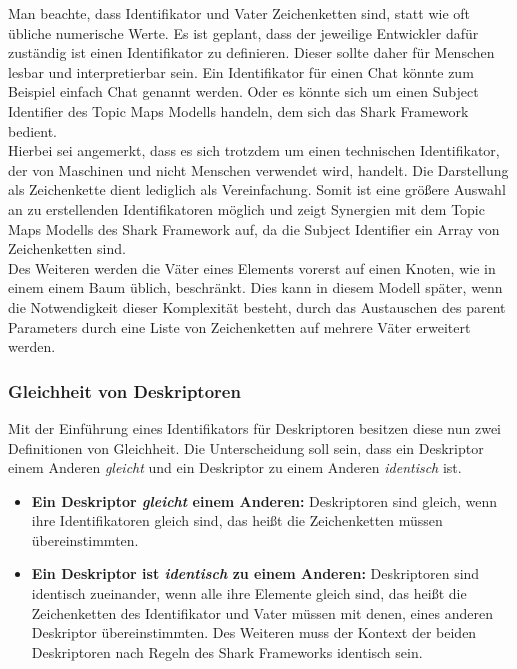 \documentclass[a4paper]{article}
\begin{document}
	Man beachte, dass Identifikator und Vater Zeichenketten sind, statt wie
	oft übliche numerische Werte. Es ist geplant, dass der jeweilige Entwickler
	dafür zuständig ist einen Identifikator zu definieren. Dieser sollte daher
	für Menschen lesbar und interpretierbar sein. Ein Identifikator für einen
	Chat könnte zum Beispiel einfach Chat genannt werden. Oder es könnte sich um
	einen Subject Identifier des Topic Maps Modells handeln, dem sich das Shark
	Framework bedient. \\
	
	Hierbei sei angemerkt, dass es sich trotzdem um einen technischen Identifikator,
	der von Maschinen und nicht Menschen verwendet wird, handelt. Die Darstellung
	als Zeichenkette dient lediglich als Vereinfachung. Somit ist eine größere
	Auswahl an zu erstellenden Identifikatoren möglich und zeigt Synergien 
	mit dem Topic Maps Modells des Shark Framework auf, da die Subject Identifier
	ein Array von Zeichenketten sind. \\
	
	Des Weiteren werden die Väter eines Elements vorerst auf einen Knoten,
	wie in einem einem Baum üblich, beschränkt. Dies kann in diesem Modell später,
	wenn die Notwendigkeit dieser Komplexität besteht, durch das Austauschen des
	parent Parameters durch eine Liste von Zeichenketten auf mehrere Väter erweitert
	werden.
	
	\subsubsection{Gleichheit von Deskriptoren}
	
	Mit der Einführung eines Identifikators für Deskriptoren besitzen
	diese nun zwei Definitionen von Gleichheit. Die Unterscheidung soll sein,
	dass ein Deskriptor einem Anderen \emph{gleicht} und ein Deskriptor zu
	einem Anderen \emph{identisch} ist.
	
	\begin{itemize}
		\item \textbf{Ein Deskriptor \emph{gleicht} einem Anderen:} Deskriptoren
		sind gleich, wenn ihre Identifikatoren gleich sind, das heißt die
		Zeichenketten müssen übereinstimmten.
		\item \textbf{Ein Deskriptor ist \emph{identisch} zu einem Anderen:}
		Deskriptoren sind identisch zueinander, wenn alle ihre Elemente gleich sind,
		das heißt die Zeichenketten des Identifikator und Vater müssen mit denen,
		eines anderen Deskriptor übereinstimmten. Des Weiteren muss der Kontext
		der beiden Deskriptoren nach Regeln des Shark Frameworks identisch sein.
	\end{itemize} 	
	
\end{document}
